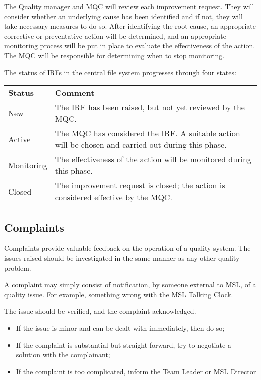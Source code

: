 The Quality manager and MQC will review each improvement request. They will consider whether an underlying cause has been identified and if not, they will take necessary measures to do so. After identifying the root cause, an appropriate corrective or preventative action will be determined, and an appropriate monitoring process will be put in place to evaluate the effectiveness of the action.  The MQC will be responsible for determining when to stop monitoring.

The status of IRFs in the central file system progresses through four states:
\begin{center}
{\renewcommand*{\arraystretch}{1.4}
\begin{tabular}{p{14.07em}p{25em}}
	\rowcolor[rgb]{ 0,  0,  0} 
	\textcolor[rgb]{ 1,  1,  1}{\textbf{Status}} & 
	\textcolor[rgb]{ 1,  1,  1}{\textbf{Comment}} \\
New & The IRF has been raised, but not yet reviewed by the MQC. \\ 
Active & The MQC has considered the IRF. A suitable action will be chosen and carried out during this phase. \\ 
Monitoring & The effectiveness of the action will be monitored during this phase. \\ 
Closed & The improvement request is closed; the action is considered effective by the MQC. \\ 
\hline 
\end{tabular} 
}
\end{center}

\subsection{Complaints}
\label{ss:complaints}
Complaints provide valuable feedback on the operation of a quality system. The issues raised should be investigated in the same manner as any other quality problem. 

A complaint may simply consist of notification, by someone external to MSL, of a quality issue. For example, something wrong with the MSL Talking Clock. 

The issue should be verified, and the complaint acknowledged.
\begin{itemize}
\item If the issue is minor and can be dealt with immediately, then do so;
\item If the complaint is substantial but straight forward, try to negotiate a solution with the complainant;
\item If the complaint is too complicated, inform the Team Leader or MSL Director
\end{itemize}

